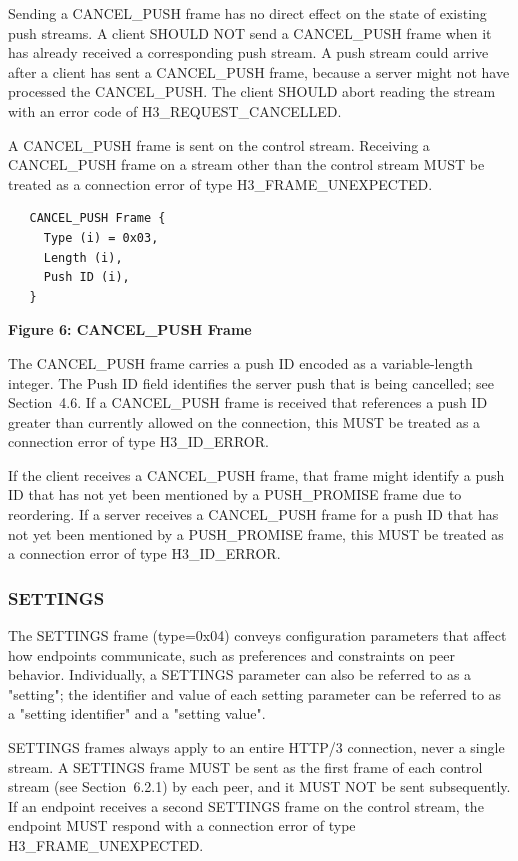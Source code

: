 \documentclass{article}
\begin{document}
Sending a CANCEL\_PUSH frame has no direct effect on the state of existing push streams.  A client SHOULD NOT send a CANCEL\_PUSH frame when it has already received a corresponding push stream.  A push stream could arrive after a client has sent a CANCEL\_PUSH frame, because a server might not have processed the CANCEL\_PUSH.  The client SHOULD abort reading the stream with an error code of H3\_REQUEST\_CANCELLED.

A CANCEL\_PUSH frame is sent on the control stream.  Receiving a CANCEL\_PUSH frame on a stream other than the control stream MUST be treated as a connection error of type H3\_FRAME\_UNEXPECTED.

\begin{verbatim}
   CANCEL_PUSH Frame {
     Type (i) = 0x03,
     Length (i),
     Push ID (i),
   }
\end{verbatim}

\begin{center}
\textbf{Figure 6: CANCEL\_PUSH Frame}
\end{center}

The CANCEL\_PUSH frame carries a push ID encoded as a variable-length integer.  The Push ID field identifies the server push that is being cancelled; see Section~4.6.  If a CANCEL\_PUSH frame is received that references a push ID greater than currently allowed on the connection, this MUST be treated as a connection error of type H3\_ID\_ERROR.

If the client receives a CANCEL\_PUSH frame, that frame might identify a push ID that has not yet been mentioned by a PUSH\_PROMISE frame due to reordering.  If a server receives a CANCEL\_PUSH frame for a push ID that has not yet been mentioned by a PUSH\_PROMISE frame, this MUST be treated as a connection error of type H3\_ID\_ERROR.

\subsubsection{SETTINGS}

The SETTINGS frame (type=0x04) conveys configuration parameters that affect how endpoints communicate, such as preferences and constraints on peer behavior.  Individually, a SETTINGS parameter can also be referred to as a "setting"; the identifier and value of each setting parameter can be referred to as a "setting identifier" and a "setting value".

SETTINGS frames always apply to an entire HTTP/3 connection, never a single stream.  A SETTINGS frame MUST be sent as the first frame of each control stream (see Section~6.2.1) by each peer, and it MUST NOT be sent subsequently.  If an endpoint receives a second SETTINGS frame on the control stream, the endpoint MUST respond with a connection error of type H3\_FRAME\_UNEXPECTED.
\end{document}
